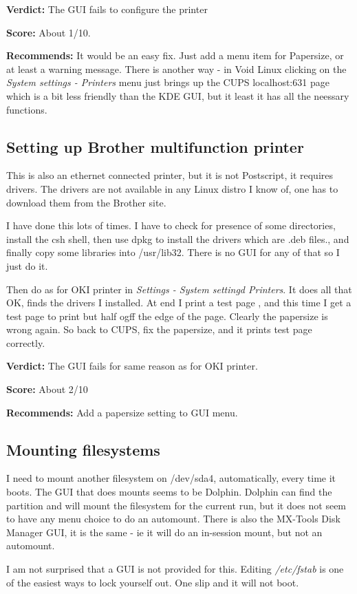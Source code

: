 \documentclass{article}  %
\begin{document}
{\bf Verdict:} The GUI fails to configure the printer

{\bf Score:} About 1/10. 

{\bf Recommends:} It would be an easy fix. Just add a menu item for Papersize, or at least a warning message.  There is another way - in Void Linux clicking on the {\em System settings - Printers} menu just brings up the CUPS localhost:631 page which is a bit less friendly than the KDE GUI, but it least it has all the neessary functions.

\subsection{Setting up Brother multifunction printer}
This is also an ethernet connected printer, but it is not Postscript, it requires drivers. The drivers are not available in any Linux distro I know of, one has to download them from the Brother site. 

I have done this  lots of times. I have to check for presence of some directories, install the csh shell, then use dpkg to install the drivers which are .deb files., and finally copy some libraries into /usr/lib32. There is no GUI for any of that so I just do it.

Then do as for OKI printer in {\em Settings - System settingd Printers}. It does all that OK, finds the drivers I installed. At end I print a test page , and this time I get a test page to print but half ogff the edge of the page. Clearly the papersize is wrong again. So back to CUPS, fix the papersize, and it prints test page correctly. 

{\bf Verdict:} The GUI fails for same reason as for OKI printer.

{\bf Score:} About 2/10

{\bf Recommends:} Add a papersize setting to GUI menu.


\subsection{Mounting filesystems}
I need to mount another filesystem on /dev/sda4,  automatically, every time it boots. The GUI that does mounts seems to be Dolphin. Dolphin can find the partition and will mount the filesystem for the current run, but it does not seem to have any menu choice to do an automount.  There is also the MX-Tools Disk Manager GUI, it is the same - ie it will do an in-session mount, but not an automount.

I am not surprised that a GUI is not provided for this. Editing {\em /etc/fstab}  is one of the easiest ways to lock yourself out. One slip and it will not boot. 
\end{document}
